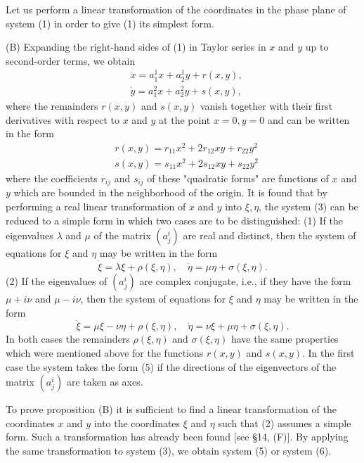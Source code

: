 \documentclass[10pt,a5paper]{book}
\theoremstyle{plain}
\theoremstyle{definition}
\theoremstyle{remark}
\begin{document}
Let us perform a linear transformation of the coordinates in the phase plane of system (1) in order to give (1) its simplest form.

(B) Expanding the right-hand sides of (1) in Taylor series in $x$ and $y$ up to second-order terms, we obtain
\begin{align*}
& \dot{x}=a_{1}^{1} x+a_{2}^{1} y+r(x, y),  \tag{3}\\
& \dot{y}=a_{1}^{2} x+a_{2}^{2} y+s(x, y),
\end{align*}
where the remainders $r(x, y)$ and $s(x, y)$ vanish together with their first derivatives with respect to $x$ and $y$ at the point $x=0, y=0$ and can be written in the form
\begin{align*}
& r(x, y)=r_{11} x^{2}+2 r_{12} x y+r_{22} y^{2} \\
& s(x, y)=s_{11} x^{2}+2 s_{12} x y+s_{22} y^{2} \tag{4}
\end{align*}
where the coefficients $r_{i j}$ and $s_{i j}$ of these "quadratic forms" are functions of $x$ and $y$ which are bounded in the neighborhood of the origin. It is found that by performing a real linear transformation of $x$ and $y$ into $\xi, \eta$, the system (3) can be reduced to a simple form in which two cases are to be distinguished: (1) If the eigenvalues $\lambda$ and $\mu$ of the matrix $\left(a_{j}^{i}\right)$ are real and distinct, then the system of equations for $\xi$ and $\eta$ may be written in the form
\begin{equation*}
\dot{\xi}=\lambda \xi+\rho(\xi, \eta), \quad \dot{\eta}=\mu \eta+\sigma(\xi, \eta) . \tag{5}
\end{equation*}
(2) If the eigenvalues of $\left(a_{j}^{i}\right)$ are complex conjugate, i.e., if they have the form $\mu+i \nu$ and $\mu-i \nu$, then the system of equations for $\xi$ and $\eta$ may be written in the form
\begin{equation*}
\dot{\xi}=\mu \xi-\nu \eta+\rho(\xi, \eta), \quad \dot{\eta}=\nu \xi+\mu \eta+\sigma(\xi, \eta) . \tag{6}
\end{equation*}
In both cases the remainders $\rho(\xi, \eta)$ and $\sigma(\xi, \eta)$ have the same properties which were mentioned above for the functions $r(x, y)$ and $s(x, y)$. In the first case the system takes the form (5) if the directions of the eigenvectors of the matrix $\left(a_{j}^{i}\right)$ are taken as axes.

To prove proposition (B) it is sufficient to find a linear transformation of the coordinates $x$ and $y$ into the coordinates $\xi$ and $\eta$ such that (2) assumes a simple form. Such a transformation has already been found [see §14, (F)]. By applying the same transformation to system (3), we obtain system (5) or system (6).
\end{document}
